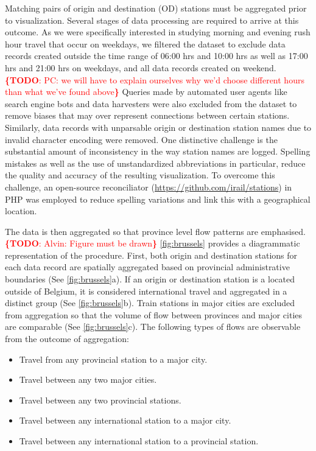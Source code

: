 \documentclass{sig-alternate}
\newcommand{\todo}[1]{\noindent\textcolor{red}{{\bf \{TODO}: #1{\bf \}}}}
\begin{document}
Matching pairs of origin and destination (OD) stations must be aggregated prior to visualization.
Several stages of data processing are required to arrive at this outcome.
As we were specifically interested in studying morning and evening rush hour travel that occur on weekdays, we filtered the dataset to exclude data records created outside the time range of 06:00 hrs and 10:00 hrs as well as 17:00 hrs and 21:00 hrs on weekdays, and all data records created on weekend.
\todo{PC: we will have to explain ourselves why we'd choose different hours than what we've found above} 
Queries made by automated user agents like search engine bots and data harvesters were also excluded from the dataset to remove biases that may over represent connections between certain stations. 
Similarly, data records with unparsable origin or destination station names due to invalid character encoding were removed. 
One distinctive challenge is the substantial amount of inconsistency in the way station names are logged. 
Spelling mistakes as well as the use of unstandardized abbreviations in particular, reduce the quality and accuracy of the resulting visualization.
To overcome this challenge, an open-source reconciliator (\url{https://github.com/irail/stations}) in PHP was employed to reduce spelling variations and link this with a geographical location. 

The data is then aggregated so that province level flow patterns are emphasised.
\todo{Alvin: Figure must be drawn}
\cref{fig:brussels} provides a diagrammatic representation of the procedure.
First, both origin and destination stations for each data record are spatially aggregated based on provincial administrative boundaries (See \cref{fig:brussels}a).
If an origin or destination station is a located outside of Belgium, it is considered international travel and aggregated in a distinct group (See \cref{fig:brussels}b).
Train stations in major cities are excluded from aggregation so that the volume of flow between provinces and major cities are comparable (See \cref{fig:brussels}c).
The following types of flows are observable from the outcome of aggregation:

\begin{itemize}
  \item Travel from any provincial station to a major city.
  \item Travel between any two major cities.
  \item Travel between any two provincial stations.
  \item Travel between any international station to a major city.
  \item Travel between any international station to a provincial station.
\end{itemize}
\end{document}
